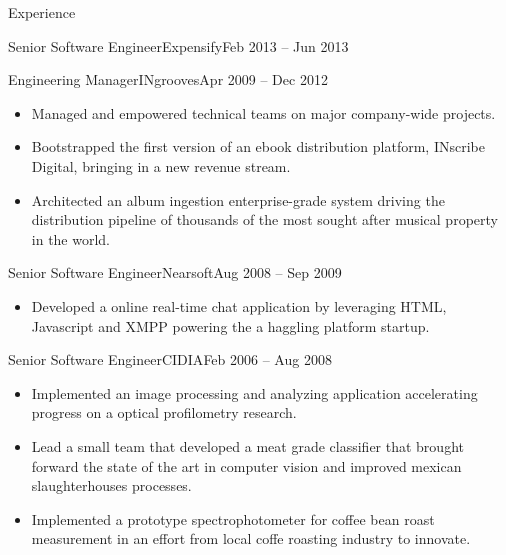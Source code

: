 \documentclass{mcdowellcv}
\begin{document}
\begin{cvsection}{Experience}
\begin{cvsubsection}{Senior Software Engineer}{Expensify}{Feb 2013 -- Jun 2013}
\begin{itemize}
		\end{itemize}
	\end{cvsubsection}
	\begin{cvsubsection}{Engineering Manager}{INgrooves}{Apr 2009 -- Dec 2012}
		\begin{itemize}%
    \item Managed and empowered technical teams on major company-wide projects.
    \item Bootstrapped the first version of an ebook distribution platform,
      INscribe Digital, bringing in a new revenue stream.
    \item Architected an album ingestion enterprise-grade system driving the
      distribution pipeline of thousands of the most sought after musical
      property in the world.
		\end{itemize}
	\end{cvsubsection}
	\begin{cvsubsection}{Senior Software Engineer}{Nearsoft}{Aug 2008 -- Sep 2009}
		\begin{itemize}%
    \item Developed a online real-time chat application by leveraging HTML,
      Javascript and XMPP powering the a haggling platform startup.
		\end{itemize}
	\end{cvsubsection}
	\begin{cvsubsection}{Senior Software Engineer}{CIDIA}{Feb 2006 -- Aug 2008}
		\begin{itemize}%
    \item Implemented an image processing and analyzing application accelerating
      progress on a optical profilometry research.
    \item Lead a small team that developed a meat grade classifier that brought
      forward the state of the art in computer vision and improved mexican
      slaughterhouses processes.
    \item Implemented a prototype spectrophotometer for coffee bean roast
      measurement in an effort from local coffe roasting industry to innovate.
		\end{itemize}
	\end{cvsubsection}
\end{cvsection}
\end{document}
